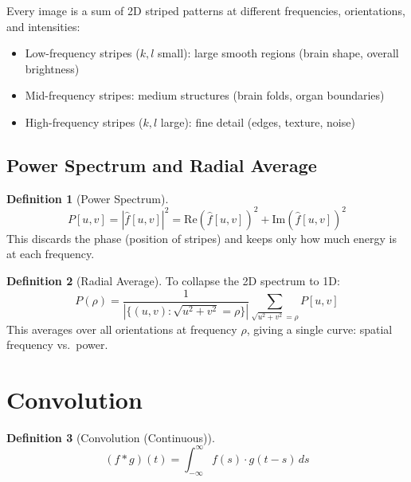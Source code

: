 \documentclass[11pt,a4paper]{article}
\theoremstyle{definition}
\newtheorem{definition}{Definition}[section]
\begin{document}
\begin{intuition}
Every image is a sum of 2D striped patterns at different frequencies, orientations, and intensities:
\begin{itemize}
    \item Low-frequency stripes ($k, l$ small): large smooth regions (brain shape, overall brightness)
    \item Mid-frequency stripes: medium structures (brain folds, organ boundaries)
    \item High-frequency stripes ($k, l$ large): fine detail (edges, texture, noise)
\end{itemize}
\end{intuition}

\subsection{Power Spectrum and Radial Average}

\begin{definition}[Power Spectrum]
\begin{equation}
    P[u,v] = |\hat{f}[u,v]|^2 = \mathrm{Re}(\hat{f}[u,v])^2 + \mathrm{Im}(\hat{f}[u,v])^2
\end{equation}
This discards the phase (position of stripes) and keeps only how much energy is at each frequency.
\end{definition}

\begin{definition}[Radial Average]
To collapse the 2D spectrum to 1D:
\begin{equation}
    P(\rho) = \frac{1}{|\{(u,v) : \sqrt{u^2+v^2} = \rho\}|} \sum_{\sqrt{u^2+v^2} = \rho} P[u,v]
\end{equation}
This averages over all orientations at frequency $\rho$, giving a single curve: spatial frequency vs.\ power.
\end{definition}

\section{Convolution}

\begin{definition}[Convolution (Continuous)]
\begin{equation}
    (f * g)(t) = \int_{-\infty}^{\infty} f(s) \cdot g(t - s) \, ds
\end{equation}
\end{definition}
\end{document}

